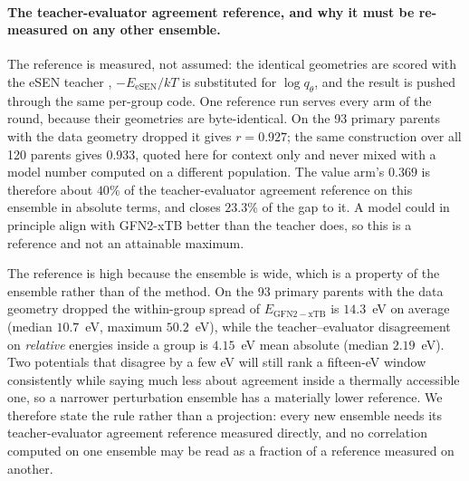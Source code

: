 \paragraph{The teacher-evaluator agreement reference, and why it must be re-measured on any
other ensemble.} The reference is measured, not assumed: the identical geometries are scored
with the eSEN teacher \citep{esen}, $-E_{\mathrm{eSEN}}/kT$ is substituted for
$\log q_\theta$, and the result is pushed through the same per-group code. One
reference run serves every arm of the round, because their geometries are
byte-identical. On the 93 primary parents with the data geometry dropped it gives
$r = 0.927$; the same construction over all 120 parents gives $0.933$, quoted here
for context only and never mixed with a model number computed on a different
population. The value arm's $0.369$ is therefore about $40\%$ of the teacher-evaluator agreement reference
on this ensemble in absolute terms, and closes $23.3\%$ of the gap to it. A model
could in principle align with GFN2-xTB better than the teacher does, so this is a
reference and not an attainable maximum.

The reference is high because the ensemble is wide, which is a property of the ensemble
rather than of the method. On the 93 primary parents with the data geometry dropped the
within-group spread of $E_{\mathrm{GFN2-xTB}}$ is $14.3$~eV on average (median
$10.7$~eV, maximum $50.2$~eV), while the teacher--evaluator disagreement on
\emph{relative} energies inside a group is $4.15$~eV mean absolute (median $2.19$~eV).
Two potentials that disagree by a few eV will still rank a fifteen-eV window
consistently while saying much less about agreement inside a thermally accessible one,
so a narrower perturbation ensemble has a materially lower reference. We therefore state
the rule rather than a projection: every new ensemble needs its teacher-evaluator agreement
reference measured directly, and no correlation computed on one ensemble may be read as
a fraction of a reference measured on another.

